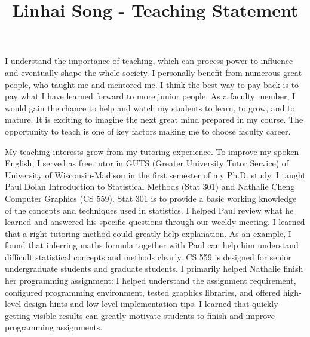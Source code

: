 \documentclass[10pt]{article}
\title{\vspace{-.7in}\bf{Linhai Song - Teaching Statement\vspace{-.4in}}}
\date{}
\begin{document}
\maketitle\vspace{-.2in}

I understand the importance of teaching, 
which can process power to influence and eventually shape the whole society. 
I personally benefit from numerous great people, who taught me and mentored me. 
I think the best way to pay back is to pay what I have learned forward to more junior people. 
As a faculty member, I would gain the chance to help and watch my students to learn, to grow, and to mature. 
It is exciting to imagine the next great mind prepared in my course.
The opportunity to teach is one of key factors making me to choose faculty career. 

My teaching interests grow from my tutoring experience. 
To improve my spoken English, 
I served as free tutor in GUTS (Greater University Tutor Service) of University of Wisconsin-Madison in the first semester of my Ph.D. study. 
I taught Paul Dolan Introduction to Statistical Methods (Stat 301) and Nathalie Cheng Computer Graphics (CS 559). 
Stat 301 is to provide a basic working knowledge of the concepts and techniques used in statistics. 
I helped Paul review what he learned and answered his specific questions through our weekly meeting. 
I learned that a right tutoring method could greatly help explanation. 
As an example, I found that inferring maths formula together with Paul can help him understand difficult statistical concepts and methods clearly. 
CS 559 is designed for senior undergraduate students and graduate students. 
I primarily helped Nathalie finish her programming assignment: 
I helped understand the assignment requirement, 
configured programming environment, 
tested graphics libraries, 
and offered high-level design hints and low-level implementation tips. 
I learned that quickly getting visible results can 
greatly motivate students to finish and improve programming assignments. 



\vspace{0.15in}
\end{document}
